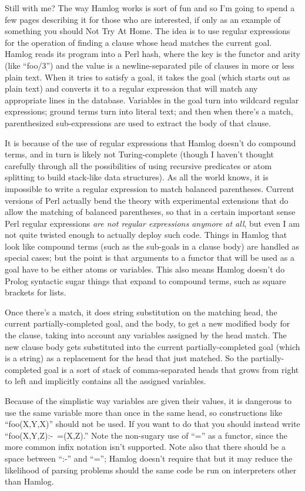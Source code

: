\documentclass[14pt]{extarticle}
\begin{document}
Still with me?  The way Hamlog works is sort of fun and so I'm going
to spend a few pages describing it for those who are interested, if only as
an example of something you should Not Try At Home.  The idea is to use
regular expressions for the operation of finding a clause whose head matches
the current goal.  Hamlog reads its program into a Perl hash, where the key
is the functor and arity (like ``foo/3'') and the value is a
newline-separated pile of clauses in more or less plain text.  When it tries
to satisfy a goal, it takes the goal (which starts out as plain text) and
converts it to a regular expression that will match any appropriate lines in
the database.  Variables in the goal turn into wildcard regular expressions;
ground terms turn into literal text; and then when there's a match,
parenthesized sub-expressions are used to extract the body of that clause.

It is because of the use of regular expressions that Hamlog doesn't do
compound terms, and in turn is likely not Turing-complete (though I haven't
thought carefully through all the possibilities of using recursive
predicates or atom splitting to build stack-like data structures).  As
all the world knows, it is impossible to write a regular expression to match
balanced parentheses.  Current versions of Perl actually bend the theory
with experimental extensions that do allow the matching of balanced
parentheses, so that in a certain important sense Perl regular expressions
\emph{are not regular expressions anymore at all}, but even I am not quite
twisted enough to actually deploy such code.  Things in Hamlog that look
like compound terms (such as the sub-goals in a clause body) are handled as
special cases; but the point is that arguments to a functor that will be
used as a goal have to be either atoms or variables.  This also means Hamlog
doesn't do Prolog syntactic sugar things that expand to compound terms, such
as square brackets for lists.

Once there's a match, it does string substitution on the matching head, the
current partially-completed goal, and the body, to get a new modified body
for the clause, taking into account any variables assigned by the head
match.  The new clause body gets substituted into the current
partially-completed goal (which is a string) as a replacement for the head
that just matched.  So the partially-completed goal is a sort of stack of
comma-separated heads that grows from right to left and implicitly contains
all the assigned variables.

Because of the simplistic way variables are given their values, it is
dangerous to use the same variable more than once in the same head, so
constructions like ``foo(X,Y,X)'' should not be used.  If you want to do
that you should instead write ``foo(X,Y,Z):-~=(X,Z).'' Note the non-sugary
use of ``='' as a functor, since the more common infix notation isn't
supported.  Note also that there should be a space between ``:-'' and ``='';
Hamlog doesn't require that but it may reduce the likelihood of parsing
problems should the same code be run on interpreters other than Hamlog.
\end{document}
